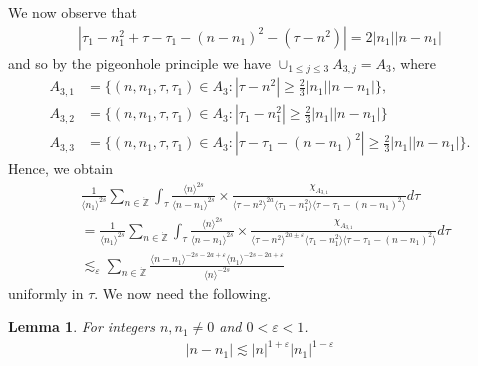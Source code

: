 \documentclass[12pt,reqno]{amsart}
\numberwithin{equation}{section}  %
\newcommand{\zz}{\mathbb{Z}}
\newcommand{\zzdot}{\dot{\zz}}
\newcommand{\ee}{\varepsilon}
\newtheorem{lemma}[theorem]{Lemma}
\begin{document}
We now observe that
%
%
\begin{equation*}
\begin{split}
  | \tau_{1} - n_{1}^{2} + \tau - \tau_{1} - (n - n_{1})^{2} - (\tau - n^{2}) | = 2| n_{1} || n - n_{1} |
\end{split}
\end{equation*}
%
%
and so by the pigeonhole principle we have $\cup_{1 \le j \le 3} A_{3,j} = A_{3}$, where 
\begin{align*}
  A_{3,1}&=\{(n, n_1, \tau, \tau_1)\in A_3: |\tau-n^{2}|\ge \frac{2}{3} |n_{1}|| n - n_{1} |\},\\
  A_{3,2}&=\{(n, n_1, \tau, \tau_1)\in A_3: |\tau_{1}-n_{1}^2|\ge \frac{2}{3} |n_{1}||n - n_{1}| \}\\
  A_{3,3}&=\{(n, n_1, \tau, \tau_1)\in A_3: |\tau - \tau_{1}-(n - n_{1})^2|\ge \frac{2}{3} |n_{1}||n - n_{1}| \}.
\end{align*} 
%
%
Hence, we obtain
%
%
%
%
%
%
%
%
%
%
%
%
%
%
\begin{equation}
  \label{region-4-1}
\begin{split}
  &  \frac{1}{\langle n_{1} \rangle^{2s}} \sum_{n \in \zzdot} \int_{\tau} \frac{\langle n \rangle ^{2s}}{\langle n - n_{1}\rangle ^{2s}}  \times \frac{\chi_{A_{3,1}}}{\langle \tau - n^{2} \rangle^{2a} \langle
      \tau_{1} - n_{1}^{2} \rangle  \langle \tau - \tau_{1} - (n - n_{1})^{2} \rangle} d \tau
  \\
  & = 
  \frac{1}{\langle n_{1} \rangle^{2s}} \sum_{n \in \zzdot} \int_{\tau} \frac{\langle n \rangle ^{2s}}{\langle n - n_{1}\rangle ^{2s}}  \times \frac{\chi_{A_{3,1}}}{\langle \tau - n^{2} \rangle^{2a \pm \ee} \langle
      \tau_{1} - n_{1}^{2} \rangle  \langle \tau - \tau_{1} - (n - n_{1})^{2} \rangle} d \tau
\\
&  \lesssim_{\ee} \sum_{n \in \zzdot} \frac{\langle n - n_{1} \rangle ^{-2s-2a + \ee} \langle n_{1} \rangle ^{-2s-2a + \ee}}{\langle
    n\rangle ^{-2s}}
      \end{split}
\end{equation}
%
uniformly in $\tau$. We now need the following.
%
%
%
%
%
%
%
%
\begin{lemma}
  For integers $n, n_{1} \neq 0$ and $0 < \ee < 1$.
  \begin{equation*}
  \begin{split}
    | n - n_{1} | \lesssim | n |^{1 + \ee} | n_{1} |^{1-\ee}
  \end{split}
  \end{equation*}
  \label{lem:key-trick}
\end{lemma}
\end{document}
